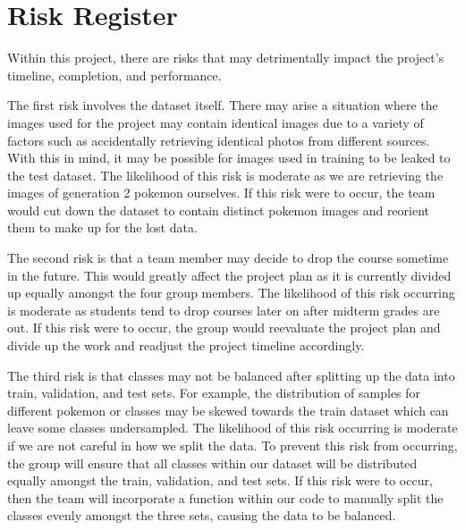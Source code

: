 \documentclass{article} %
\begin{document}
\section {Risk Register}

Within this project, there are risks that may detrimentally impact the project’s timeline, 
completion, and performance. 

The first risk involves the dataset itself. There may arise a situation where the images used for the project may contain identical images due to a variety of factors such as accidentally retrieving identical photos from different sources. With this in mind, it may be possible for images used in training to be leaked to the test dataset. The likelihood of this risk is moderate as we are retrieving the images of generation 2 pokemon ourselves. If this risk were to occur, the team would cut down the dataset to contain distinct pokemon images and reorient them to make up for the lost data.

The second risk is that a team member may decide to drop the course sometime in the future. This would greatly affect the project plan as it is currently divided up equally amongst the four group members. The likelihood of this risk occurring is moderate as students tend to drop courses later on after midterm grades are out. If this risk were to occur, the group would reevaluate the project plan and divide up the work and readjust the project timeline accordingly. 

The third risk is that classes may not be balanced after splitting up the data into train, validation, and test sets. For example, the distribution of samples for different pokemon or classes may be skewed towards the train dataset which can leave some classes undersampled. The likelihood of this risk occurring is moderate if we are not careful in how we split the data. To prevent this risk from occurring, the group will ensure that all classes within our dataset will be distributed equally amongst the train, validation, and test sets. If this risk were to occur, then the team will incorporate a function within our code to manually split the classes evenly amongst the three sets, causing the data to be balanced. 


\label{last_page}



\end{document}
